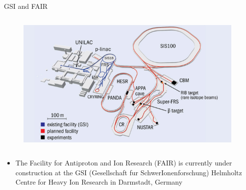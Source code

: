 \begin{columnframe}{GSI and FAIR}
    \begin{column}{0.5\textwidth}
        \begin{figure}
            \centering
            \includegraphics[width=\textwidth, frame]{images/fair_sis100_diagram.jpg}
        \end{figure}
    \end{column}
    \begin{column}{0.5\textwidth}
        \begin{itemize}
            \item The Facility for Antiproton and Ion Research (FAIR) is currently
                  under construction at the GSI (Gesellschaft fur SchwerIonenforschung)
                  Helmholtz Centre for Heavy Ion Research in Darmstadt, Germany
        \end{itemize}
    \end{column}
\end{columnframe}

